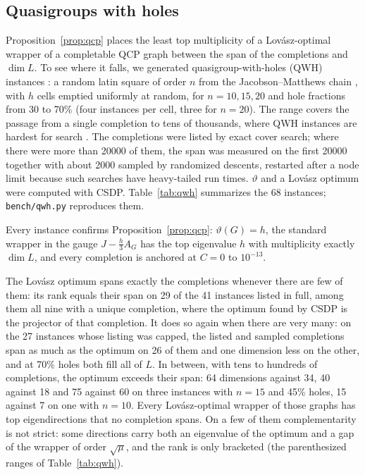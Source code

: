 \documentclass[11pt]{article}
\theoremstyle{definition}
\theoremstyle{remark}
\begin{document}
\subsection{Quasigroups with holes}
\label{sec:qwh}

Proposition~\ref{prop:qcp} places the least top multiplicity of a
Lov\'asz-optimal wrapper of a completable QCP graph between the span of the
completions and $\dim L$. To see where it falls, we generated
quasigroup-with-holes (QWH) instances \cite{AGKS00}: a random latin square of
order $n$ from the Jacobson--Matthews chain \cite{JM96}, with $h$ cells
emptied uniformly at random, for $n=10,15,20$ and hole fractions from 30 to
70\% (four instances per cell, three for $n=20$). The range covers the
passage from a single completion to tens of thousands, where QWH instances
are hardest for search \cite{AGKS00}. The completions were listed by exact
cover search; where there were more than 20000 of them, the span was
measured on the first 20000 together with about 2000 sampled by randomized
descents, restarted after a node limit because such searches have
heavy-tailed run times. $\vartheta$ and a Lov\'asz optimum were computed with CSDP.
Table~\ref{tab:qwh} summarizes the 68 instances; \texttt{bench/qwh.py}
reproduces them.

Every instance confirms Proposition~\ref{prop:qcp}: $\vartheta(G)=h$, the
standard wrapper in the gauge $J-\frac h3A_G$ has the top eigenvalue $h$
with multiplicity exactly $\dim L$, and every completion is anchored at
$C=0$ to $10^{-13}$.

The Lov\'asz optimum spans exactly the completions whenever there are few of
them: its rank equals their span on 29 of the 41 instances listed in full,
among them all nine with a unique completion, where the optimum found by
CSDP is the projector of that completion. It does so again when there are
very many: on the 27 instances whose listing was capped, the listed and
sampled completions span as much as the optimum on 26 of them and one
dimension less on the other, and at 70\% holes both fill all of $L$. In between, with
tens to hundreds of completions, the optimum exceeds their span: 64
dimensions against 34, 40 against 18 and 75 against 60 on three instances
with $n=15$ and 45\% holes, 15 against 7 on one with $n=10$. Every
Lov\'asz-optimal wrapper of those graphs has top eigendirections that no
completion spans. On a few of them complementarity is not strict: some
directions carry both an eigenvalue of the optimum and a gap of the wrapper
of order $\sqrt\mu$, and the rank is only bracketed (the parenthesized
ranges of Table~\ref{tab:qwh}).
\end{document}
